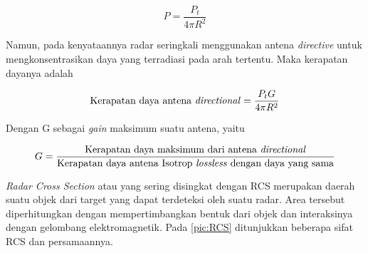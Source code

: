 \begin{equation}
	P = \frac{P_{t}}{4\pi R^{2}}
\end{equation}

Namun, pada kenyataannya radar seringkali menggunakan antena \textit{directive} untuk mengkonsentrasikan daya yang terradiasi pada arah tertentu. Maka kerapatan dayanya adalah

\begin{equation}
	\text{Kerapatan daya antena \textit{directional}} = \frac{P_{t} G}{4\pi R^{2}}
\end{equation}

Dengan G sebagai \textit{gain} maksimum suatu antena, yaitu

\begin{equation}
	G  = \frac{\text{Kerapatan daya maksimum dari antena \textit{directional}}}{\text{Kerapatan daya antena Isotrop \textit{lossless} dengan daya yang sama}}
\end{equation}


\textit{Radar Cross Section} atau yang sering disingkat dengan RCS merupakan daerah suatu objek dari target yang dapat terdeteksi oleh suatu radar. Area tersebut diperhitungkan dengan mempertimbangkan bentuk dari objek dan interaksinya dengan gelombang elektromagnetik. Pada \ref{pic:RCS} ditunjukkan beberapa sifat RCS dan persamaannya.

